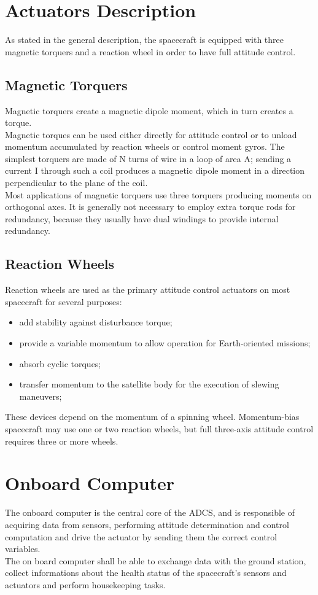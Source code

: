 \documentclass[11pt,a4paper]{report}
\begin{document}
\section{Actuators Description}
As stated in the general description, the spacecraft is equipped with three magnetic torquers and a reaction wheel in order to have full attitude control.
\subsection{Magnetic Torquers}
Magnetic torquers create a magnetic dipole moment, which in turn creates a
torque.\\
Magnetic torques can be used either directly for attitude control or to unload momentum accumulated by reaction wheels or control moment gyros. The simplest torquers are made of N turns of wire in a loop of area A; sending a current
I through such a coil produces a magnetic dipole moment in a direction perpendicular to the plane of the coil. \\
Most applications of magnetic torquers use three torquers producing moments
on orthogonal axes. It is generally not necessary to employ extra torque rods
for redundancy, because they usually have dual windings to provide internal
redundancy. 

\subsection{Reaction Wheels}
Reaction wheels are used as the primary attitude control actuators on most spacecraft for several purposes: 

\begin{itemize}
 \item add stability against disturbance torque;
 \item provide a variable momentum to allow operation for Earth-oriented missions;
 \item absorb cyclic torques;
 \item transfer momentum to the satellite body for the execution of slewing maneuvers;
\end{itemize}

These devices depend on the momentum of a spinning wheel.
Momentum-bias spacecraft may use one or two reaction wheels, but
full three-axis attitude control requires three or more wheels.

\section{Onboard Computer}
The onboard computer is the central core of the ADCS, and is responsible of acquiring data from sensors, performing attitude determination and control computation and drive the actuator by sending them the correct control variables.\\
The on board computer shall be able to exchange data with the ground station, collect informations about the health status of the spacecraft's sensors and actuators and perform housekeeping tasks.
\end{document}
